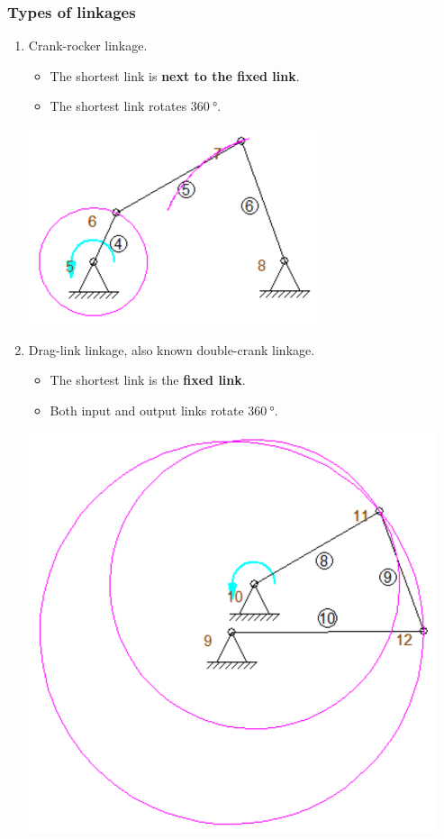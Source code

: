 \documentclass[11pt]{article}
\begin{document}
\subsubsection{Types of linkages}
\label{sec:orgfe8054d}
\begin{enumerate}
\item Crank-rocker linkage.
\begin{itemize}
\item The shortest link is \textbf{next to the fixed link}.
\item The shortest link rotates \(\qty{360}{\degree}\).
\end{itemize}

\begin{center}
\includegraphics[scale=1]{./images/crank-rocker-linkage-image.png}
\end{center}

\item Drag-link linkage, also known double-crank linkage.
\begin{itemize}
\item The shortest link is the \textbf{fixed link}.
\item Both input and output links rotate \(\qty{360}{\degree}\).
\end{itemize}

\begin{center}
\includegraphics[scale=1]{./images/drag-link-linkage-image.png}
\end{center}


\end{enumerate}
\end{document}
